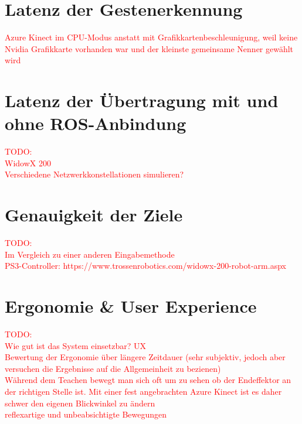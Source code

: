 
\section{Latenz der Gestenerkennung}
\textcolor{red}{Azure Kinect im CPU-Modus anstatt mit Grafikkartenbeschleunigung, weil keine Nvidia Grafikkarte vorhanden war und der kleinste gemeinsame Nenner gewählt wird}

\section{Latenz der Übertragung mit und ohne ROS-Anbindung}
\textcolor{red}{TODO:\\
WidowX 200\\
Verschiedene Netzwerkkonstellationen simulieren? %
}

\section{Genauigkeit der Ziele}
\textcolor{red}{TODO:\\
Im Vergleich zu einer anderen Eingabemethode\\
PS3-Controller: https://www.trossenrobotics.com/widowx-200-robot-arm.aspx
}

\section{Ergonomie \& User Experience}
\textcolor{red}{TODO:\\
Wie gut ist das System einsetzbar? UX\\
Bewertung der Ergonomie über längere Zeitdauer (sehr subjektiv, jedoch aber versuchen die Ergebnisse auf die Allgemeinheit zu bezienen)\\
Während dem Teachen bewegt man sich oft um zu sehen ob der Endeffektor an der richtigen Stelle ist. Mit einer fest angebrachten Azure Kinect ist es daher schwer den eigenen Blickwinkel zu ändern\\
reflexartige und unbeabsichtigte Bewegungen
}
